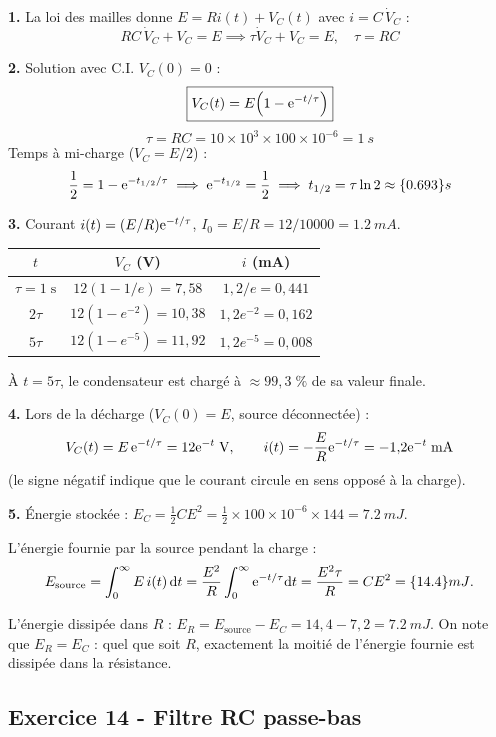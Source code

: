 \documentclass[12pt,a4paper]{article}
\begin{document}
\begin{boitecorrige}
\textbf{1.} La loi des mailles donne $E = Ri(t) + V_C(t)$ avec $i=C\,\dot V_C$ :
\[
RC\,\dot V_C + V_C = E \implies \tau\dot V_C + V_C = E, \quad \tau = RC
\]

\textbf{2.} Solution avec C.I. $V_C(0)=0$ :
\[
\boxed{V_C(t) = E\!\left(1-\mathrm{e}^{-t/\tau}\right)}
\]
\[
\tau = RC = 10\times10^3\times100\times10^{-6} = \qty{1}{s}
\]
Temps à mi-charge ($V_C = E/2$) :
\[
\frac{1}{2} = 1-\mathrm{e}^{-t_{1/2}/\tau} \implies \mathrm{e}^{-t_{1/2}} = \frac{1}{2} \implies t_{1/2} = \tau\ln 2 \approx \qty{0.693}{s}
\]

\textbf{3.} Courant $i(t) = (E/R)\mathrm{e}^{-t/\tau}$, $I_0 = E/R = 12/10000 = \qty{1.2}{mA}$.
\begin{center}
\begin{tabular}{c|c|c}
$t$ & $V_C$ (V) & $i$ (mA)\\
\hline
$\tau=1\;\text{s}$ & $12(1-1/e)=7{,}58$ & $1{,}2/e=0{,}441$\\
$2\tau$ & $12(1-e^{-2})=10{,}38$ & $1{,}2e^{-2}=0{,}162$\\
$5\tau$ & $12(1-e^{-5})=11{,}92$ & $1{,}2e^{-5}=0{,}008$\\
\end{tabular}
\end{center}
À $t=5\tau$, le condensateur est chargé à $\approx99{,}3\;\%$ de sa valeur finale.

\textbf{4.} Lors de la décharge ($V_C(0)=E$, source déconnectée) :
\[
V_C(t) = E\,\mathrm{e}^{-t/\tau} = 12\mathrm{e}^{-t}\;\text{V}, \qquad i(t) = -\frac{E}{R}\mathrm{e}^{-t/\tau} = -1{,}2\mathrm{e}^{-t}\;\text{mA}
\]
(le signe négatif indique que le courant circule en sens opposé à la charge).

\textbf{5.} Énergie stockée : $E_C = \frac{1}{2}CE^2 = \frac{1}{2}\times100\times10^{-6}\times144 = \qty{7.2}{mJ}$.

L'énergie fournie par la source pendant la charge :
\[
E_\text{source} = \int_0^\infty E\,i(t)\,\mathrm{d}t = \frac{E^2}{R}\int_0^\infty\mathrm{e}^{-t/\tau}\mathrm{d}t = \frac{E^2\tau}{R} = CE^2 = \qty{14.4}{mJ}.
\]

L'énergie dissipée dans $R$ : $E_R = E_\text{source} - E_C = 14{,}4 - 7{,}2 = \qty{7.2}{mJ}$. On note que $E_R = E_C$ : quel que soit $R$, exactement la moitié de l'énergie fournie est dissipée dans la résistance.
\end{boitecorrige}

\subsection*{Exercice 14 - Filtre RC passe-bas \niveau{\moyen}}
\end{document}
